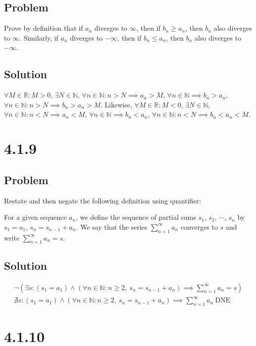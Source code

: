 \documentclass[12pt]{article}
\newcommand{\round}[1]{\left(       #1 \right)      }
\newcommand{\R}    [0]{\mathbb{R}                   }
\newcommand{\N}    [0]{\mathbb{N}                   }
\begin{document}
\subsection*{Problem}
Prove by definition that if $a_n$ diverges to $\infty$, then if $b_n \geq a_n$, then $b_n$ also diverges to $\infty$. Similarly, if $a_n$ diverges to $-\infty$, then if $b_n \leq a_n$, then $b_n$ also diverges to $-\infty$.

\subsection*{Solution}
$\forall M \in \R : M > 0$, $\exists N \in \N$, $\forall n \in \N : n > N \implies a_n > M$, $\forall n \in \N \implies b_n > a_n$, $\forall n \in \N : n > N \implies b_n > a_n > M$. Likewise, $\forall M \in \R : M < 0$, $\exists N \in \N$, $\forall n \in \N : n < N \implies a_n < M$, $\forall n \in \N \implies b_n < a_n$, $\forall n \in \N : n < N \implies b_n < a_n < M$.



\section*{4.1.9}

\subsection*{Problem}
Restate and then negate the following definition using quantifier:

For a given sequence $a_n$, we define the sequence of partial sums $s_1$, $s_2$, $\cdots$, $s_n$ by $s_1 = a_1$, $s_n = s_{n - 1} + a_n$. We say that the series $\sum_{n = 1}^\infty a_n$ converges to $s$ and write $\sum_{n = 1}^\infty a_n = s$.

\subsection*{Solution}
\begin{align*}
    \neg \round{\exists s : (s_1 = a_1) \wedge (\forall n \in \N : n \geq 2,\ s_n = s_{n-1} + a_n) \implies \sum_{n=1}^\infty a_n = s} \\
    \nexists s : (s_1 = a_1) \wedge (\forall n \in \N : n \geq 2,\ s_n = s_{n-1} + a_n) \implies \sum_{n=1}^\infty a_n \ \text{DNE}
\end{align*}



\section*{4.1.10}
\end{document}
